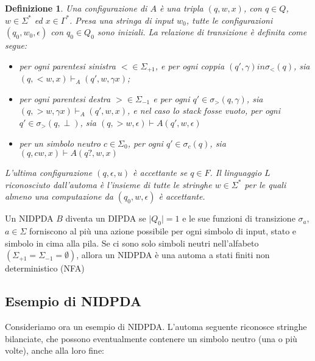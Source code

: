 \documentclass[a4paper,12pt]{report}
\newtheorem{definition}{Definizione}[chapter]
\theoremstyle{propositionstyle}
\begin{document}
    \begin{definition}\label{def:configuration-non-det}
        Una configurazione di $A$ è una tripla $\left(q, w, x\right)$, con $q \in Q$, $w \in \Sigma^*$ ed $x \in \Gamma^*$.
        Presa una stringa di input $w_0$, tutte le configurazioni $(q_0, w_0, \epsilon)$ con $q_0 \in Q_0$ sono iniziali.
        La relazione di transizione è definita come segue:

    \begin{itemize}
        \item per ogni parentesi sinistra $< \in \Sigma_{+1}$, e per ogni coppia $\left(q', \gamma\right) in \sigma_<\left(q\right)$, sia $(q, <w, x) \vdash_{A} (q', w, \gamma x)$;
        \item per ogni parentesi destra $> \in \Sigma_{-1}$ e per ogni $q' \in \sigma_>\left(q, \gamma\right)$, sia $(q, >w, \gamma x) \vdash_{A} (q', w, x)$, e nel caso lo stack fosse vuoto, per ogni $q' \in \sigma_>\left(q, \perp\right)$, sia $\left(q, >w, \epsilon\right) \vdash{A} \left(q', w, \epsilon\right)$
        \item per un simbolo neutro $c \in \Sigma_0$, per ogni $q' \in \sigma_c\left(q\right)$, sia $\left(q, cw, x\right) \vdash{A} \left(q?, w, x\right)$
    \end{itemize}

    L'ultima configurazione $\left(q, \epsilon, u\right)$ è accettante se $q \in F$.
    Il linguaggio $L$ riconosciuto dall'automa è l'insieme di tutte le stringhe $w \in \Sigma^*$ per le quali almeno una computazione da $\left(q_0, w, \epsilon\right)$ è accettante.

    \end{definition}

    Un NIDPDA $B$ diventa un DIPDA se $\lvert Q_0\rvert = 1$ e le sue funzioni di transizione $\sigma_a$, $a \in \Sigma$ forniscono al più una azione possibile per ogni simbolo di input, stato e simbolo in cima alla pila.
    Se ci sono solo simboli neutri nell'alfabeto $\left(\Sigma_{+1} = \Sigma_{-1} = \emptyset\right)$, allora un NIDPDA è una automa a stati finiti non deterministico (NFA)

    \subsection{Esempio di NIDPDA}
    
    Consideriamo ora un esempio di NIDPDA. L'automa seguente riconosce stringhe bilanciate, che possono eventualmente contenere un simbolo neutro (una o più volte), anche alla loro fine:
\end{document}

